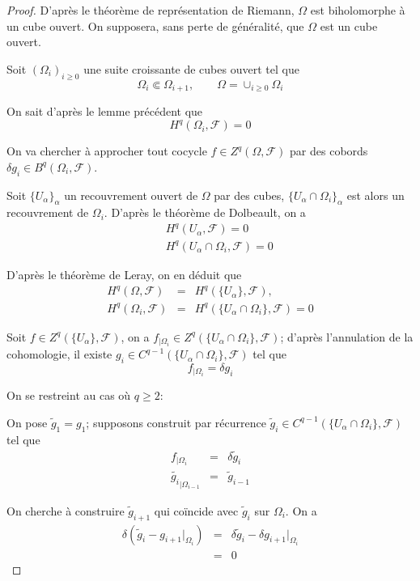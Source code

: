 \documentclass{article}
\theoremstyle{definition}
\theoremstyle{remarque}
\begin{document}
\begin{proof}
D'après le théorème de représentation de Riemann, $\Omega$ est biholomorphe à un cube ouvert. On supposera, sans perte de généralité, que $\Omega$ est un cube ouvert.

Soit $(\Omega_i)_{i \geq 0}$ une suite croissante de cubes ouvert tel que
\begin{equation*}
\Omega_i \Subset \Omega_{i+1}, \qquad
\Omega = \cup_{i \geq 0} \Omega_i
\end{equation*}

On sait d'après le lemme précédent que
$$H^q(\Omega_i, \mathcal{F})=0$$

On va chercher à approcher tout cocycle $f \in Z^q(\Omega, \mathcal{F})$ par des cobords $\delta g_i \in B^q(\Omega_i, \mathcal{F})$.

Soit $\{U_\alpha\}_\alpha$ un recouvrement ouvert de $\Omega$ par des cubes, $\{U_\alpha \cap \Omega_i\}_\alpha$ est alors un recouvrement de $\Omega_i$. D'après le théorème de Dolbeault, on a
\begin{eqnarray}
\nonumber &&H^q(U_\alpha, \mathcal{F}) = 0 \\
\nonumber &&H^q(U_\alpha \cap \Omega_i, \mathcal{F}) = 0
\end{eqnarray}


D'après le théorème de Leray, on en déduit que
\begin{eqnarray}
\nonumber H^q(\Omega, \mathcal{F}) &=& H^q(\{U_\alpha\}, \mathcal{F}), \\
\nonumber H^q(\Omega_i, \mathcal{F}) &=& H^q(\{U_\alpha \cap \Omega_i\}, \mathcal{F})=0
\end{eqnarray}

Soit $f \in Z^q(\{U_\alpha\}, \mathcal{F})$, on a $f_{|\Omega_i} \in Z^q(\{U_\alpha\cap \Omega_i\}, \mathcal{F})$; d'après l'annulation de la cohomologie, il existe $g_i \in C^{q-1}(\{U_\alpha\cap \Omega_i\}, \mathcal{F})$ tel que
$$f_{|\Omega_i} = \delta g_i$$

On se restreint au cas où $q \geq 2$:

On pose $\tilde{g}_1=g_1$; supposons construit par récurrence $\tilde{g}_i \in  C^{q-1}(\{U_\alpha\cap \Omega_i\}, \mathcal{F})$ tel que
\begin{eqnarray}
\nonumber f_{|\Omega_i} &=& \delta \tilde{g}_i \\
\nonumber \tilde{g_i}_{|\Omega_{i-1}} &=& \tilde{g}_{i-1}
\end{eqnarray}

On cherche à construire $\tilde{g}_{i+1}$ qui coïncide avec $\tilde{g}_i$ sur $\Omega_i$. On a
\begin{eqnarray}
\nonumber \delta(\tilde{g}_i - g_{i+1}{|_{\Omega_{i}}})&=& \delta \tilde{g}_i  - \delta g_{i+1}{|_{\Omega_{i}}}\\
\nonumber &=& 0
\end{eqnarray}


\end{proof}
\end{document}
